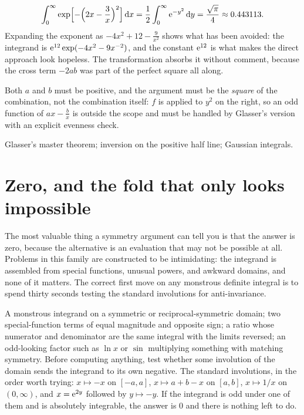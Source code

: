 \begin{worked}
\[\int_0^{\infty}\exp\Bigl[-\Bigl(2x-\frac3x\Bigr)^{2}\Bigr]\,\mathrm{d} x=\frac12\int_0^{\infty}\mathrm{e}^{-y^{2}}\,\mathrm{d} y=\frac{\sqrt{\pi}}{4}\approx0.443113.\]
Expanding the exponent as $-4x^{2}+12-\tfrac{9}{x^{2}}$ shows what has been avoided: the integrand is $\mathrm{e}^{12}\exp(-4x^{2}-9x^{-2})$, and the constant $\mathrm{e}^{12}$ is what makes the direct approach look hopeless. The transformation absorbs it without comment, because the cross term $-2ab$ was part of the perfect square all along.
\end{worked}

\begin{trap}
Both $a$ and $b$ must be positive, and the argument must be the \emph{square} of the combination, not the combination itself: $f$ is applied to $y^{2}$ on the right, so an odd function of $ax-\tfrac bx$ is outside the scope and must be handled by Glasser's version with an explicit evenness check.
\end{trap}

\begin{seealsob}Glasser's master theorem; inversion on the positive half line; Gaussian integrals.\end{seealsob}

\section{Zero, and the fold that only looks impossible}

The most valuable thing a symmetry argument can tell you is that the answer is zero, because the alternative is an evaluation that may not be possible at all. Problems in this family are constructed to be intimidating: the integrand is assembled from special functions, unusual powers, and awkward domains, and none of it matters. The correct first move on any monstrous definite integral is to spend thirty seconds testing the standard involutions for anti-invariance.

\cue A monstrous integrand on a symmetric or reciprocal-symmetric domain; two special-function terms of equal magnitude and opposite sign; a ratio whose numerator and denominator are the same integral with the limits reversed; an odd-looking factor such as $\ln x$ or $\sin$ multiplying something with matching symmetry.
\method Before computing anything, test whether some involution of the domain sends the integrand to its own negative. The standard involutions, in the order worth trying: $x\mapsto-x$ on $[-a,a]$, $x\mapsto a+b-x$ on $[a,b]$, $x\mapsto1/x$ on $(0,\infty)$, and $x=\mathrm{e}^{2y}$ followed by $y\mapsto-y$. If the integrand is odd under one of them and is absolutely integrable, the answer is $0$ and there is nothing left to do.

